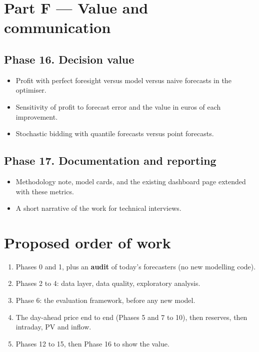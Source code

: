 \documentclass[11pt,a4paper]{article}
\begin{document}
\section{Part F --- Value and communication}

\subsection{Phase 16. Decision value}
\begin{itemize}
\item Profit with perfect foresight versus model versus naive forecasts in the optimiser.
\item Sensitivity of profit to forecast error and the value in euros of each improvement.
\item Stochastic bidding with quantile forecasts versus point forecasts.
\end{itemize}

\subsection{Phase 17. Documentation and reporting}
\begin{itemize}
\item Methodology note, model cards, and the existing dashboard page extended with these metrics.
\item A short narrative of the work for technical interviews.
\end{itemize}

\section{Proposed order of work}
\begin{enumerate}
\item Phases 0 and 1, plus an \textbf{audit} of today's forecasters (no new modelling code).
\item Phases 2 to 4: data layer, data quality, exploratory analysis.
\item Phase 6: the evaluation framework, before any new model.
\item The day-ahead price end to end (Phases 5 and 7 to 10), then reserves, then intraday, PV and inflow.
\item Phases 12 to 15, then Phase 16 to show the value.
\end{enumerate}
\end{document}
